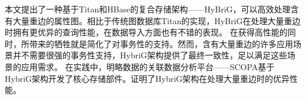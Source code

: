 
本文提出了一种基于Titan和HBase的复合存储架构——HyBriG，可以高效处理含有大量重边的属性图。相比于传统图数据库Titan的实现，HyBriG在处理大量重边时拥有更优异的查询性能，在数据导入方面也有不错的表现。
在获得高性能的同时，所带来的牺牲就是简化了对事务性的支持。然而，含有大量重边的许多应用场景并不需要很强的事务性支持，HybriG架构提供了最终一致性，足以满足这些场景的应用需求。
在实践中，明略数据的关联数据分析平台——SCOPA基于HybriG架构开发了核心存储部件。证明了HybriG架构在处理大量重边时的优异性能。


